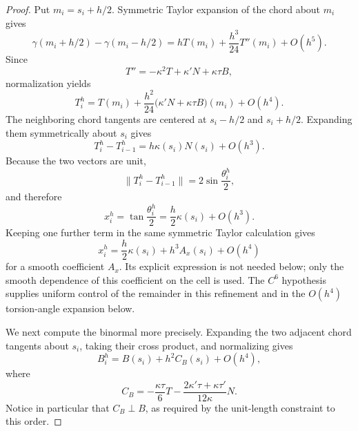 \documentclass[10pt,a4paper]{amsart}
\theoremstyle{definition}
\theoremstyle{remark}
\numberwithin{equation}{section}
\begin{document}
\begin{proof}
Put \(m_i=s_i+h/2\). Symmetric Taylor expansion of the chord about \(m_i\) gives
\[
\gamma(m_i+h/2)-\gamma(m_i-h/2)
=hT(m_i)+\frac{h^3}{24}T''(m_i)+O(h^5).
\]
Since
\[
T''=-\kappa^2T+\kappa'N+\kappa\tau B,
\]
normalization yields
\begin{equation}
T_i^h
=
T(m_i)+\frac{h^2}{24}
\bigl(\kappa'N+\kappa\tau B\bigr)(m_i)+O(h^4).
\label{eq:chord-expansion}
\end{equation}
The neighboring chord tangents are centered at \(s_i-h/2\) and
\(s_i+h/2\). Expanding them symmetrically about \(s_i\) gives
\[
T_i^h-T_{i-1}^h=h\kappa(s_i)N(s_i)+O(h^3).
\]
Because the two vectors are unit,
\[
\|T_i^h-T_{i-1}^h\|
=2\sin\frac{\theta_i^h}{2},
\]
and therefore
\begin{equation}
x_i^h=\tan\frac{\theta_i^h}{2}
=\frac h2\kappa(s_i)+O(h^3).
\label{eq:x-asymptotic}
\end{equation}
Keeping one further term in the same symmetric Taylor calculation gives
\[
x_i^h=\frac h2\kappa(s_i)+h^3A_x(s_i)+O(h^4)
\]
for a smooth coefficient $A_x$. Its explicit expression is not needed below; only the smooth dependence of this coefficient on the cell is used. The $C^6$ hypothesis supplies uniform control of the remainder in this refinement and in the $O(h^4)$ torsion-angle expansion below.

We next compute the binormal more precisely.  Expanding the two adjacent
chord tangents about \(s_i\), taking their cross product, and normalizing
gives
\begin{equation}
B_i^h
=
B(s_i)+h^2C_B(s_i)+O(h^4),
\label{eq:B-asymptotic}
\end{equation}
where
\begin{equation}
C_B
=
-\frac{\kappa\tau}{6}T
-\frac{2\kappa'\tau+\kappa\tau'}{12\kappa}N.
\label{eq:CB-explicit}
\end{equation}
Notice in particular that \(C_B\perp B\), as required by the unit-length
constraint to this order.


\end{proof}
\end{document}
